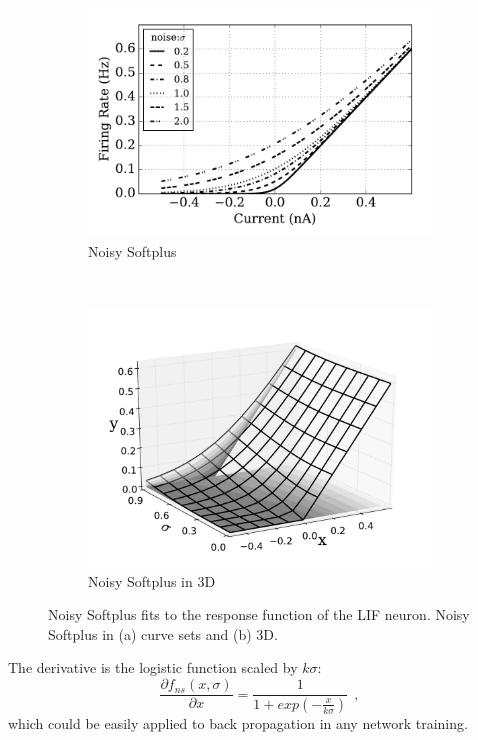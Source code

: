 	\begin{figure}[thb!]
		\centering
		\begin{subfigure}[t]{0.7\textwidth}
			\includegraphics[width=\textwidth]{pics_iconip/4.pdf}
			\caption{Noisy Softplus}
		\end{subfigure}\\
		\begin{subfigure}[t]{0.8\textwidth}
			\includegraphics[width=\textwidth]{pics_iconip/5.pdf}
			\caption{Noisy Softplus in 3D}
		\end{subfigure}
		\caption{
			Noisy Softplus fits to the response function of the LIF neuron.
			Noisy Softplus in (a) curve sets and (b) 3D.}
		\label{fig:nsp}
	\end{figure}	
	
	The derivative is the logistic function scaled by $k\sigma$:
	\begin{equation}
	\frac{\partial f_{ns}(x,\sigma)}{\partial x} = \frac{1}{1+exp(-\frac{x}{k\sigma})}~~,
	\label{equ:logist}
	\end{equation}	
	which could be easily applied to back propagation in any network training.
	
